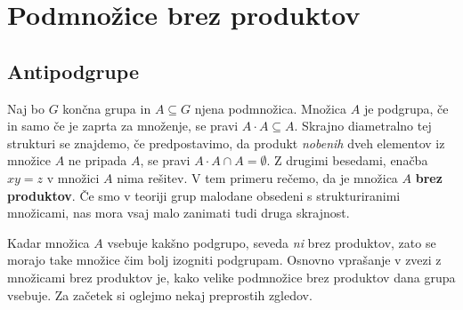 \documentclass[11pt]{book}
\def\definicija{\color{rdeca}\bf}
\theoremstyle{definition}
\theoremstyle{zgled}
\theoremstyle{zgledbrezstevilke}
\theoremstyle{odprtproblem}
\theoremstyle{domacanaloga}
\theoremstyle{izrek}
\begin{document}
\section{Podmnožice brez produktov}

\subsection{Antipodgrupe}

Naj bo $G$ končna grupa in $A \subseteq G$ njena podmnožica. Množica $A$ je podgrupa, če in samo če je zaprta za množenje, se pravi $A \cdot A \subseteq A$. Skrajno diametralno tej strukturi se znajdemo, če predpostavimo, da produkt \emph{nobenih} dveh elementov iz množice $A$ ne pripada $A$, se pravi $A \cdot A \cap A = \emptyset$. Z drugimi besedami, enačba $xy = z$ v množici $A$ nima rešitev. V tem primeru rečemo, da je množica $A$ {\definicija brez produktov}. Če smo v teoriji grup malodane obsedeni s strukturiranimi množicami, nas mora vsaj malo zanimati tudi druga skrajnost. 

Kadar množica $A$ vsebuje kakšno podgrupo, seveda \emph{ni} brez produktov, zato se morajo take množice čim bolj izogniti podgrupam. Osnovno vprašanje v zvezi z množicami brez produktov je, kako velike podmnožice brez produktov dana grupa vsebuje. Za začetek si oglejmo nekaj preprostih zgledov.
\end{document}
